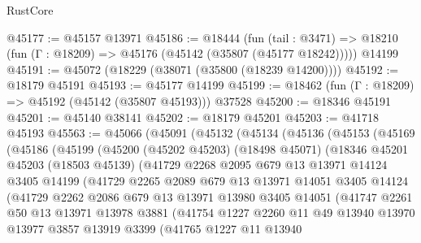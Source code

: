 \begin{lexlean}{RustCore}
\begin{coremodule}
@45177 := @45157 @13971
@45186 := @18444
    (fun (tail : @3471) => @18210 (fun (Γ : @18209) => @45176 (@45142 (@35807 (@45177 @18242)))))
    @14199
@45191 := @45072 (@18229 (@38071 (@35800 (@18239 @14200))))
@45192 := @18179 @45191
@45193 := @45177 @14199
@45199 := @18462 (fun (Γ : @18209) => @45192 (@45142 (@35807 @45193))) @37528
@45200 := @18346 @45191
@45201 := @45140 @38141
@45202 := @18179 @45201
@45203 := @41718 @45193
@45563 := @45066
    (@45091
      (@45132
        (@45134
          (@45136
            (@45153
              (@45169
                (@45186
                  (@45199
                    (@45200
                      (@45202 @45203)
                      (@18498 @45071)
                      (@18346
                        @45201
                        @45203
                        (@18503 @45139)
                        (@41729
                          @2268
                          @2095
                          @679
                          @13
                          @13971
                          @14124
                          @3405
                          @14199
                          (@41729
                            @2265
                            @2089
                            @679
                            @13
                            @13971
                            @14051
                            @3405
                            @14124
                            (@41729
                              @2262
                              @2086
                              @679
                              @13
                              @13971
                              @13980
                              @3405
                              @14051
                              (@41747
                                @2261
                                @50
                                @13
                                @13971
                                @13978
                                @3881
                                (@41754
                                  @1227
                                  @2260
                                  @11
                                  @49
                                  @13940
                                  @13970
                                  @13977
                                  @3857
                                  @13919
                                  @3399
                                  (@41765
                                    @1227
                                    @11
                                    @13940

\end{coremodule}
\end{lexlean}
